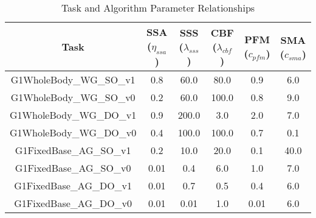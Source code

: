 \begin{table}[h]
\centering
\captionsetup{width=0.95\textwidth}
\caption{Task and Algorithm Parameter Relationships}
\label{tb:task_params}

\begin{tabular}{c|ccccc}
\toprule
\textbf{Task} & \textbf{SSA ($\eta_{ssa}$)} & \textbf{SSS ($\lambda_{sss}$)} & \textbf{CBF ($\lambda_{cbf}$)} & \textbf{PFM ($c_{pfm}$)} & \textbf{SMA ($c_{sma}$)} \\
\midrule
G1WholeBody\_WG\_SO\_v1 & 0.8 & 60.0 & 80.0 & 0.9 & 6.0 \\
G1WholeBody\_WG\_SO\_v0 & 0.2 & 60.0 & 100.0 & 0.8 & 9.0 \\  
G1WholeBody\_WG\_DO\_v1 & 0.9 & 200.0 & 3.0 & 2.0 & 7.0 \\
G1WholeBody\_WG\_DO\_v0 & 0.4 & 100.0 & 100.0 & 0.7 & 0.1 \\  
G1FixedBase\_AG\_SO\_v1 & 0.2 & 10.0 & 20.0 & 0.1 & 40.0 \\
G1FixedBase\_AG\_SO\_v0 & 0.01 & 0.4 & 6.0 & 1.0 & 7.0 \\  
G1FixedBase\_AG\_DO\_v1 & 0.01 & 0.7 & 0.5 & 0.4 & 6.0 \\
G1FixedBase\_AG\_DO\_v0 & 0.01 & 0.01 & 1.0 & 0.01 & 6.0 \\  
\bottomrule
\end{tabular}
\end{table}

